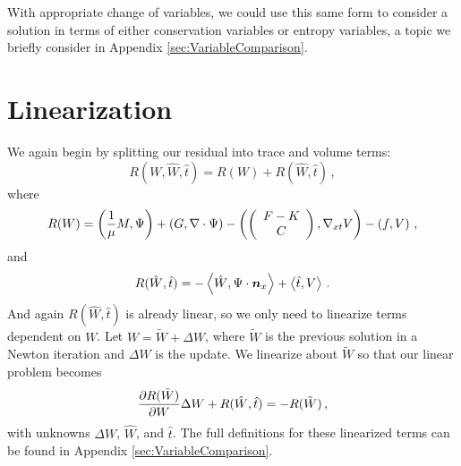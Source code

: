 \documentclass[Dissertation.tex]{subfiles}
\begin{document}
With appropriate change of variables, we could use this same form to consider a solution in terms
of either conservation variables or entropy variables, 
a topic we briefly consider in Appendix \ref{sec:VariableComparison}.


\section{Linearization}
We again begin by splitting our residual into trace and volume terms:
\[
R(W,\hat W,\hat t) = R(W) + R(\hat W,\hat t)\,,
\]
where
\[
R(W)=
\left( \frac{1}{\mu}M,\Psi \right)+\left( G,\nabla\cdot\Psi \right)
-\left( \left( \begin{array}{c} F-K\\ C\\ \end{array} \right),\nabla_{xt} V \right)-\left( f,V \right)\,,
\]
and
\[
R(\hat W,\hat t)=
-\left\langle \hat W,\Psi\cdot\boldsymbol n_x \right\rangle
+\left\langle \hat t,V \right\rangle\,.
\]
And again $R(\hat W,\hat t)$ is already linear, so we only need to linearize terms dependent on $W$.
Let $W=\tilde W+\Delta W$, where $\tilde W$ is the previous solution in a Newton iteration and 
$\Delta W$ is the update. We linearize about $\tilde W$ so that our linear problem becomes
\[
\frac{\partial R(\tilde W)}{\partial W}\Delta W+R(\hat W,\hat t)=-R(\tilde W)\,,
\]
with unknowns $\Delta W$, $\hat W$, and $\hat t$.
The full definitions for these linearized terms can be found in Appendix \ref{sec:VariableComparison}.
\end{document}
